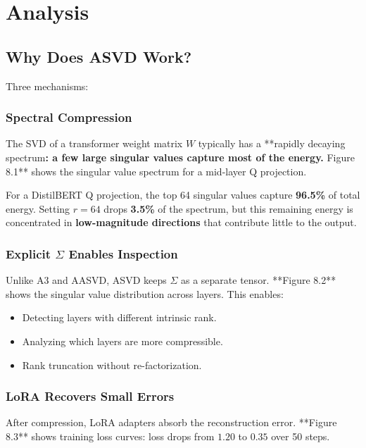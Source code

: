 
\section{Analysis}

\subsection{Why Does ASVD Work?}

Three mechanisms:

\subsubsection{Spectral Compression}

The SVD of a transformer weight matrix $W$ typically has a **rapidly decaying 
spectrum\textbf{: a few large singular values capture most of the energy. }Figure 
8.1** shows the singular value spectrum for a mid-layer Q projection.

For a DistilBERT Q projection, the top 64 singular values capture 
\textbf{96.5\%} of total energy. Setting $r = 64$ drops 
\textbf{3.5\%} of the spectrum, but this remaining energy is 
concentrated in \textbf{low-magnitude directions} that contribute little to 
the output.

\subsubsection{Explicit $\Sigma$ Enables Inspection}

Unlike A3 and AASVD, ASVD keeps $\Sigma$ as a separate tensor. **Figure 
8.2** shows the singular value distribution across layers. This enables:

\begin{itemize}
\item Detecting layers with different intrinsic rank.
\item Analyzing which layers are more compressible.
\item Rank truncation without re-factorization.

\end{itemize}
\subsubsection{LoRA Recovers Small Errors}

After compression, LoRA adapters absorb the reconstruction error. **Figure 
8.3** shows training loss curves: loss drops from $1.20$ to 
$0.35$ over 50 steps.


